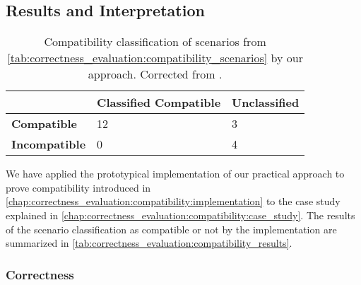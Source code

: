 \subsection{Results and Interpretation}

\begin{table}
    \centering
    \small
    \renewcommand{\arraystretch}{1.2}%
    \setlength\tabcolsep{4 pt}
    \begin{tabular}{L{2cm} C{3.5cm} C{2.3cm}}
        \toprule
         & \textbf{Classified Compatible} & \textbf{Unclassified} \\
         \midrule
         \textbf{Compatible} & 12 & 3\\
         \textbf{Incompatible} & 0 & 4\\
         \bottomrule
    \end{tabular}
    \caption[Correctness of compatibility classification results]{Compatibility classification of scenarios from \autoref{tab:correctness_evaluation:compatibility_scenarios} by our approach. Corrected from .}
    \label{tab:correctness_evaluation:compatibility_results}
\end{table}

We have applied the prototypical implementation of our practical approach to prove compatibility introduced in \autoref{chap:correctness_evaluation:compatibility:implementation} to the case study explained in \autoref{chap:correctness_evaluation:compatibility:case_study}.
The results of the scenario classification as compatible or not by the implementation are summarized in \autoref{tab:correctness_evaluation:compatibility_results}.


\subsubsection{Correctness}

